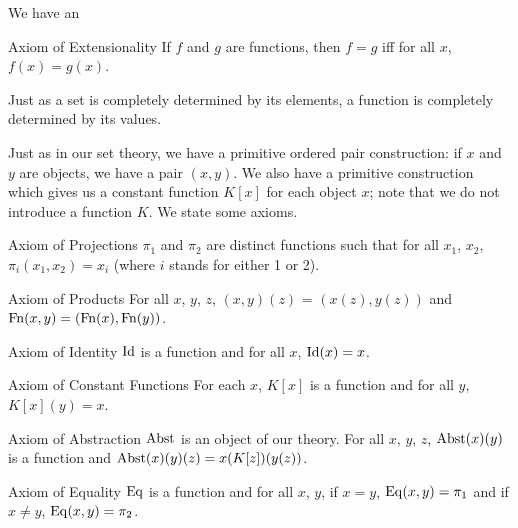 We have an

\begin{axiom}{Axiom of Extensionality}
 If $f$ and $g$ are functions, then
 $f=g$ iff for all $x$, $f(x)=g(x)$.
\end{axiom}


Just as a set is completely determined by its elements, a function is
completely determined by its values.

Just as in our set theory, we have a primitive ordered pair
construction: if $x$ and $y$ are objects, we have a pair $(x,y)$.  We
also have a primitive construction which gives us a constant function $K[x]$
for each object $x$; note that we do not introduce a function $K$.  We
state some axioms.

\begin{axiom}{Axiom of Projections}
 $\pi_1$ and $\pi_2$ are distinct functions
 such that for all $x_1$, $x_2$, $\pi_i(x_1,x_2) = x_i$ (where $i$
 stands for either 1 or 2).
\end{axiom}

\begin{axiom}{Axiom of Products}
 For all $x$, $y$, $z$, $(x,y)(z)$ =
 $(x(z),y(z))$ and $\mathop{\mathrm{Fn}}(x,y) = (\mathop{\mathrm{Fn}}(x),\mathop{\mathrm{Fn}}(y))$.
\end{axiom}

\begin{axiom}{Axiom of Identity}
 $\mathop{\mathrm{Id}}$ is a function and for all $x$, $\mathop{\mathrm{Id}}(x) = x$. 
\end{axiom}

\begin{axiom}{Axiom of Constant Functions}
 For each $x$, $K[x]$ is a function
 and for all $y$, $K[x](y) = x$.
\end{axiom}

\begin{axiom}{Axiom of
Abstraction}
 $\mathop{\mathrm{Abst}}$ is an object of our theory.  For all
 $x$, $y$, $z$, $\mathop{\mathrm{Abst}}(x)(y)$ is a function and $\mathop{\mathrm{Abst}}(x)(y)(z) =
 x(K[z])(y(z))$.
\end{axiom}

\begin{axiom}{Axiom of Equality}
 $\mathop{\mathrm{Eq}}$ is a function and for all $x$, $y$, if
 $x=y$, $\mathop{\mathrm{Eq}}(x,y) = \pi_1$ and if $x\neq y$, $\mathop{\mathrm{Eq}}(x,y) = \pi_2$.
\end{axiom}


